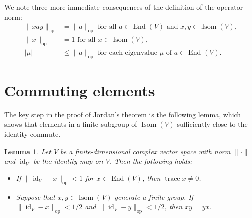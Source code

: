 \documentclass[12pt]{amsart}
\theoremstyle{plain}
\newtheorem{lemma}[theorem]{Lemma}
\theoremstyle{definition}
\numberwithin{equation}{section}
\newcommand*{\abs}[1]{\lvert#1\rvert}
\newcommand*{\norm}[1]{\lVert#1\rVert}
\newcommand*{\normop}[1]{\lVert#1\rVert_\text{op}}
\DeclareMathOperator{\trace}{trace}
\DeclareMathOperator{\id}{id}
\DeclareMathOperator{\End}{End}
\DeclareMathOperator{\U}{Isom}
\begin{document}
We note three more immediate consequences of the definition of the
operator norm:
\begin{align*}
  \normop{xay} &= \normop{a} \text{ for all $a\in\End(V)$ and $x,
                 y\in\U(V)$},\\
  \normop{x} &= 1 \text{ for all $x\in\U(V)$},\\
  \abs{\mu} &\le \normop{a} \text{ for each eigenvalue $\mu$ of
              $a\in\End(V)$}.
\end{align*}

\section{Commuting elements}
The key step in the proof of Jordan's theorem is the following lemma,
which shows that elements in a finite subgroup of $\U(V)$ sufficiently
close to the identity commute.
\begin{lemma}\label{l:xy=yx}
  Let $V$ be a finite-dimensional complex vector space with norm
  $\norm{\cdot}$ and $\id_V$ be the identity map on $V$. Then the
  following holds:
  \begin{itemize}
  \item[(a)] If $\normop{\id_V-x}<1$ for $x\in\End(V)$, then $\trace
    x\ne0$.
  \item[(b)] Suppose that $x,y\in\U(V)$ generate a finite group. If
    $\normop{\id_V-x}<1/2$ and $\normop{\id_V-y}<1/2$, then $xy=yx$.
  \end{itemize}
\end{lemma}
\end{document}
